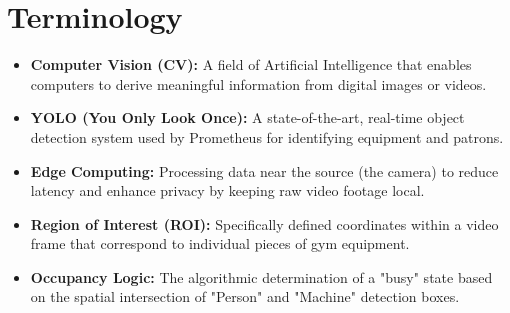 \section{Terminology}
\label{section:terminology}
\begin{itemize}
    \item \textbf{Computer Vision (CV):} A field of Artificial Intelligence that enables computers to derive meaningful information from digital images or videos.
    \item \textbf{YOLO (You Only Look Once):} A state-of-the-art, real-time object detection system used by Prometheus for identifying equipment and patrons.
    \item \textbf{Edge Computing:} Processing data near the source (the camera) to reduce latency and enhance privacy by keeping raw video footage local.
    \item \textbf{Region of Interest (ROI):} Specifically defined coordinates within a video frame that correspond to individual pieces of gym equipment.
    \item \textbf{Occupancy Logic:} The algorithmic determination of a "busy" state based on the spatial intersection of "Person" and "Machine" detection boxes.
\end{itemize}